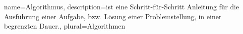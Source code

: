 {
	name={Algorithmus},
	description={ist eine Schritt-für-Schritt Anleitung für die Ausführung einer Aufgabe, bzw. Lösung einer Problemstellung, in einer begrenzten Dauer.},
	plural={Algorithmen}	
}